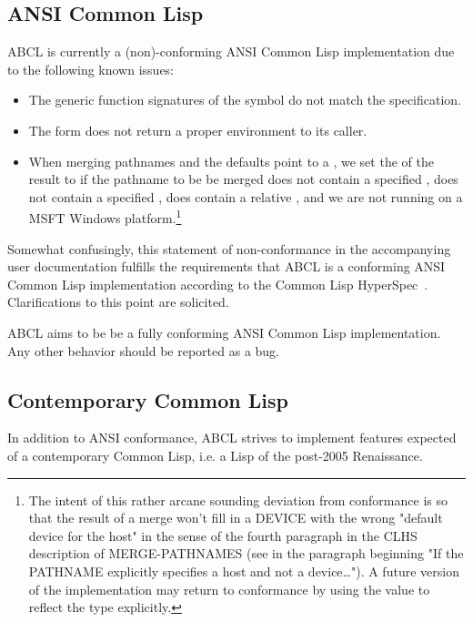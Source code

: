 \documentclass[10pt]{book}
\begin{document}
\subsection{ANSI Common Lisp}
\textsc{ABCL} is currently a (non)-conforming ANSI Common Lisp
implementation due to the following known issues:

\begin{itemize}
\item The generic function signatures of the  symbol
  do not match the specification.
\item The  form does not return a proper 
  environment to its caller.
\item When merging pathnames and the defaults point to a ,
  we set the  of the result to  if the pathname to be
  be merged does not contain a specified , does not contain a
  specified , does contain a relative , and we are
  not running on a \textsc{MSFT} Windows platform.\footnote{The intent of this
    rather arcane sounding deviation from conformance is so that the
    result of a merge won't fill in a DEVICE with the wrong "default
    device for the host" in the sense of the fourth paragraph in the
    CLHS description of MERGE-PATHNAMES (see in \cite{CLHS} the paragraph beginning
    "If the PATHNAME explicitly specifies a host and not a device…").
    A future version of the implementation may return to conformance
    by using the  value to reflect the type explicitly.
  }

\end{itemize}

Somewhat confusingly, this statement of non-conformance in the
accompanying user documentation fulfills the requirements that
\textsc{ABCL} is a conforming ANSI Common Lisp implementation according
to the Common Lisp HyperSpec~\cite{CLHS}.  Clarifications to this point
are solicited.

ABCL aims to be be a fully conforming ANSI Common Lisp implementation.
Any other behavior should be reported as a bug.

\subsection{Contemporary Common Lisp}
In addition to ANSI conformance, \textsc{ABCL} strives to implement
features expected of a contemporary Common Lisp, i.e. a Lisp of the
post-2005 Renaissance.
\end{document}
